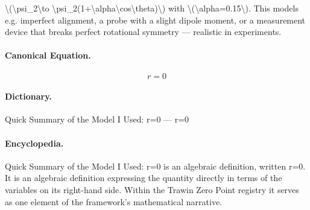 \textbackslash{}(\textbackslash{}psi\_2\textbackslash{}to \textbackslash{}psi\_2(1+\textbackslash{}alpha\textbackslash{}cos\textbackslash{}theta)\textbackslash{}) with \textbackslash{}(\textbackslash{}alpha=0.15\textbackslash{}). This models e.g. imperfect alignment, a probe with a slight dipole moment, or a measurement device that breaks perfect rotational symmetry — realistic in experiments.

\paragraph{Canonical Equation.}
\[
r=0
\]

\paragraph{Dictionary.}
Quick Summary of the Model I Used: r=0 — r=0

\paragraph{Encyclopedia.}
Quick Summary of the Model I Used: r=0 is an algebraic definition, written r=0. It is an algebraic definition expressing the quantity directly in terms of the variables on its right-hand side. Within the Trawin Zero Point registry it serves as one element of the framework's mathematical narrative.
